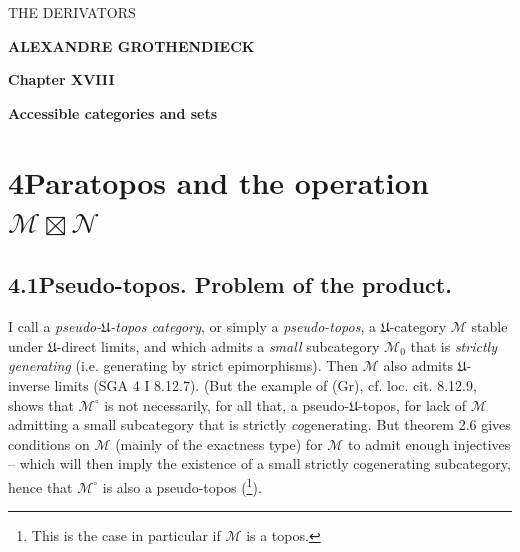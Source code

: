 \documentclass[11pt]{article}
\newcommand{\printedpage}[1]{\marginpar{\footnotesize p.~#1}}
\newcommand{\msp}[1]{\marginpar{\footnotesize [#1]}}
\begin{document}
\printedpage{} %

\begin{center}
{\Large\textsf{THE DERIVATORS}}

\bigskip

\textbf{ALEXANDRE GROTHENDIECK}

\bigskip\bigskip

\textbf{Chapter XVIII}

\medskip

\textbf{Accessible categories and sets}
\end{center}

\newpage


\printedpage{1}

\msp{page 50}

\section*{4\quad Paratopos and the operation $\mathcal{M}\boxtimes\mathcal{N}$}

\subsection*{4.1\quad Pseudo-topos. Problem of the product.}

I call a \textit{pseudo-$\mathfrak{U}$-topos category}, or simply a \textit{pseudo-topos}, a $\mathfrak{U}$-category $\mathcal{M}$ stable under $\mathfrak{U}$-direct limits, and which admits a \textit{small} subcategory $\mathcal{M}_0$ that is \textit{strictly generating} (i.e. generating by strict epimorphisms). Then $\mathcal{M}$ also admits $\mathfrak{U}$-inverse limits (SGA 4 I 8.12.7). (But the example of (Gr), cf. loc. cit. 8.12.9, shows that $\mathcal{M}^\circ$ is not necessarily, for all that, a pseudo-$\mathfrak{U}$-topos, for lack of $\mathcal{M}$ admitting a small subcategory that is strictly \textit{co}generating. But theorem 2.6 gives conditions on $\mathcal{M}$ (mainly of the exactness type) %
\msp{page 51}
for $\mathcal{M}$ to admit enough injectives -- which will then imply the existence of a small strictly cogenerating subcategory, hence that $\mathcal{M}^\circ$ is also a pseudo-topos (\footnote{This is the case in particular if $\mathcal{M}$ is a topos.}).
\end{document}
